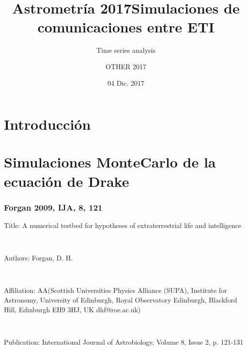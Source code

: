 \documentclass[handout]{beamer}
\author[]{Time series analysis}
\title[]{\textbf{Astrometría 2017}}
\date {\tiny{04 Dic. 2017}}
\institute[]{}%
\theoremstyle{plain}
\theoremstyle{definition}
\theoremstyle{remark}
\begin{document}
\author{OTHER 2017}
\title{Simulaciones de comunicaciones entre ETI}
\maketitle

\footnotesize


\section{Introducci\'on}


\section{Simulaciones MonteCarlo de la ecuación de Drake}

\begin{frame}\frametitle{Forgan 2009, IJA, 8, 121}
\centering

Title: A numerical testbed for hypotheses of extraterrestrial life and intelligence

\

Authors:	Forgan, D. H.

\

Affiliation:	AA(Scottish Universities Physics Alliance (SUPA), Institute for Astronomy, University of Edinburgh, Royal Observatory Edinburgh, Blackford Hill, Edinburgh EH9 3HJ, UK dhf@roe.ac.uk)

\

Publication:	International Journal of Astrobiology, Volume 8, Issue 2, p. 121-131
\end{frame}
\end{document}
